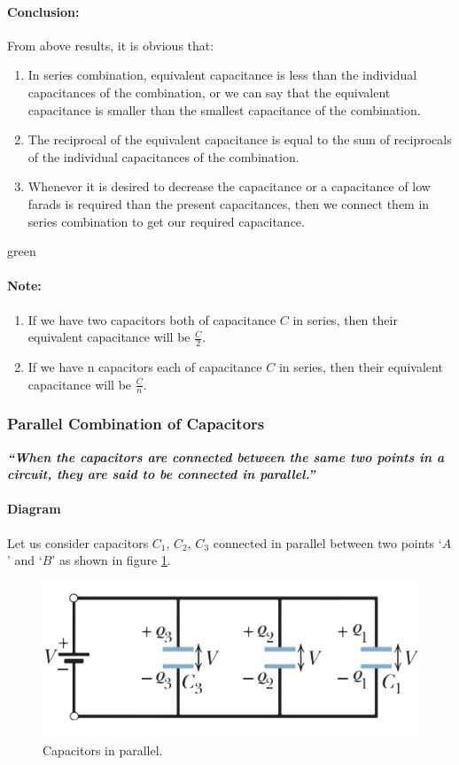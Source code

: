 \paragraph{Conclusion:}
From above results, it is obvious that:
\begin{enumerate}[label = (\roman*)]
\item In series combination, equivalent capacitance is less than the
individual capacitances of the combination, or we can say that the
equivalent capacitance is smaller than the smallest capacitance of the
combination.
\item The reciprocal of the equivalent capacitance is equal to the sum
of reciprocals of the individual capacitances of the combination.
\item Whenever it is desired to decrease the capacitance or a
capacitance of low farads is required than the present capacitances,
then we connect them in series combination to get our required capacitance.
\end{enumerate}
\begin{mybox}{green}{}
\paragraph*{\note{}Note:}
\begin{enumerate}[label = (\roman*)]
\item If we have two capacitors both of capacitance $C$ in series, then their
equivalent capacitance will be $\frac{C}{2}$.
\item If we have n capacitors each of capacitance $C$ in series, then their
equivalent capacitance will be $\frac{C}{n}$.
\end{enumerate}
\end{mybox}
\subsubsection{Parallel Combination of Capacitors}
\textit{\textbf{“When the capacitors are connected between the same two
points in a circuit, they are said to be connected in parallel.”}}
\paragraph{Diagram}
Let us consider capacitors $C_{1}$, $C_{2}$,
$C_{3}$ connected in parallel between two points `$A$' and `$B$'
as shown in figure \ref{fig:11.33}.
\begin{figure}[H]
  \centering
  \includegraphics[scale = 0.45]{Images/Chapter-11/11.33}
  \caption{Capacitors in parallel.}
  \label{fig:11.33}
\end{figure}
